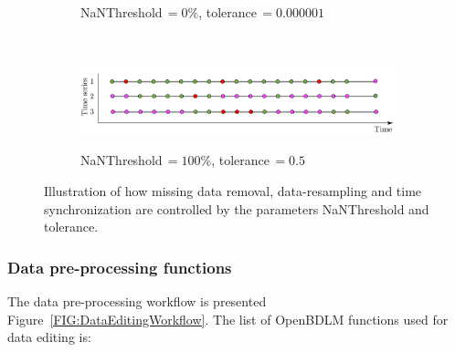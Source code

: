 \begin{figure}[htbp]
\begin{subfigure}{\linewidth}
\caption{NaNThreshold$\,=0$\%, tolerance$\,=0.000001$}
\end{subfigure}\\[12pt]
\begin{subfigure}{\linewidth}\centering
\includegraphics[width=0.9\linewidth]{./docfigs/time_synchro_5.pdf} \\[-8pt]
\caption{NaNThreshold$\,=100$\%, tolerance$\,=0.5$}
\end{subfigure}
\caption{Illustration of how missing data removal, data-resampling and time synchronization are controlled by the parameters  NaNThreshold and tolerance.}
\label{FIG:time_sync}
\end{figure}

\subsubsection{Data pre-processing functions}

The data pre-processing workflow is presented Figure~\ref{FIG:DataEditingWorkflow}. The list of OpenBDLM functions used for data editing is:

